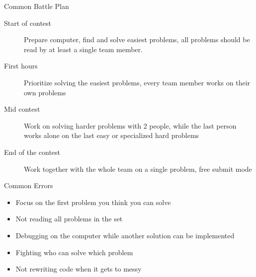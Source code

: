 \documentclass[11pt,pdf, aspectratio=169]{beamer}
\begin{document}
  \begin{frame}{Common Battle Plan}
    \begin{description}
      \item [Start of contest] Prepare computer, find and solve easiest problems, all problems should be read by at least a single team member.
      \item[First hours] Prioritize solving the easiest problems, every team member works on their own problems
      \item[Mid contest] Work on solving harder problems with 2 people, while the last person works alone on the last easy or specialized hard problems
      \item[End of the contest] Work together with the whole team on a single problem, free submit mode
    \end{description}
  \end{frame}
  \begin{frame}{Common Errors}
    \begin{itemize}
      \item Focus on the first problem you think you can solve
      \item Not reading all problems in the set
      \item Debugging on the computer while another solution can be implemented
      \item Fighting who can solve which problem
      \item Not rewriting code when it gets to messy
    \end{itemize}
  \end{frame}
\end{document}
